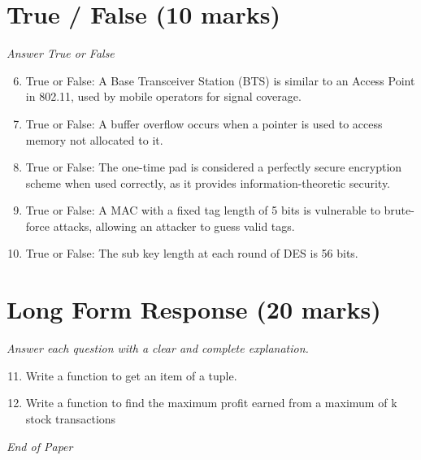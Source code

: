 \documentclass[12pt]{article}
\begin{document}
\section*{True / False (10 marks)}
\textit{Answer True or False}
\begin{enumerate}[label=\arabic*.]
\setcounter{enumi}{5}
\item True or False: A Base Transceiver Station (BTS) is similar to an Access Point in 802.11, used by mobile operators for signal coverage.
\item True or False: A buffer overflow occurs when a pointer is used to access memory not allocated to it.
\item True or False: The one-time pad is considered a perfectly secure encryption scheme when used correctly, as it provides information-theoretic security.
\item True or False: A MAC with a fixed tag length of 5 bits is vulnerable to brute-force attacks, allowing an attacker to guess valid tags.
\item True or False: The sub key length at each round of DES is 56 bits.
\end{enumerate}

\section*{Long Form Response (20 marks)}
\textit{Answer each question with a clear and complete explanation.}
\begin{enumerate}[label=\arabic*.]
\setcounter{enumi}{10}
\item Write a function to get an item of a tuple.
\item Write a function to find the maximum profit earned from a maximum of k stock transactions
\end{enumerate}

\vfill
\noindent\textit{End of Paper}
\end{document}
